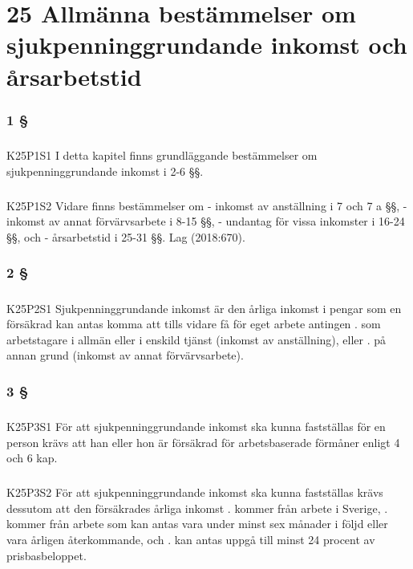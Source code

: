 \documentclass[a4paper,notitlepage,openany,10pt]{book}
\begin{document}
\chapter*{25 Allmänna bestämmelser om sjukpenninggrundande inkomst och årsarbetstid}
\subsection*{1 §}
\paragraph*{}
{\tiny K25P1S1}
I detta kapitel finns grundläggande bestämmelser om sjukpenninggrundande inkomst i 2-6 §§.
\paragraph*{}
{\tiny K25P1S2}
Vidare finns bestämmelser om
\newline - inkomst av anställning i 7 och 7 a §§,
\newline - inkomst av annat förvärvsarbete i 8-15 §§,
\newline - undantag för vissa inkomster i 16-24 §§, och
\newline - årsarbetstid i 25-31 §§.
Lag (2018:670).
\subsection*{2 §}
\paragraph*{}
{\tiny K25P2S1}
Sjukpenninggrundande inkomst är den årliga inkomst i pengar som en försäkrad kan antas komma att tills vidare få för eget arbete antingen
. som arbetstagare i allmän eller i enskild tjänst (inkomst av anställning), eller
. på annan grund (inkomst av annat förvärvsarbete).
\subsection*{3 §}
\paragraph*{}
{\tiny K25P3S1}
För att sjukpenninggrundande inkomst ska kunna fastställas för en person krävs att han eller hon är försäkrad för arbetsbaserade förmåner enligt 4 och 6 kap.
\paragraph*{}
{\tiny K25P3S2}
För att sjukpenninggrundande inkomst ska kunna fastställas krävs dessutom att den försäkrades årliga inkomst
. kommer från arbete i Sverige,
. kommer från arbete som kan antas vara under minst sex månader i följd eller vara årligen återkommande, och
. kan antas uppgå till minst 24 procent av prisbasbeloppet.
\end{document}
